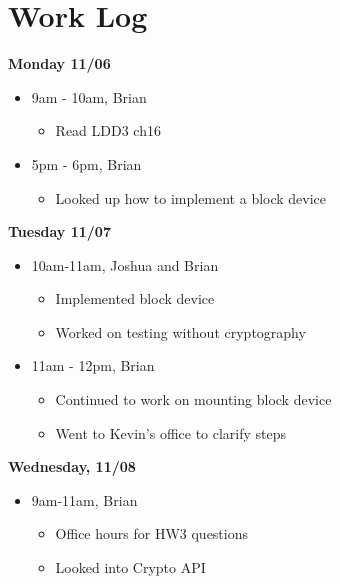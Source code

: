 \documentclass[letterpaper, onecolumn, draftclsnofoot, 10pt, compsoc]{IEEEtran}
\begin{document}
\section{Work Log}
    \begin{singlespace}
        \textbf{Monday 11/06}
            \begin{itemize}
                \item 9am - 10am, Brian 
                \begin{itemize}
                    \item Read LDD3 ch16
                \end{itemize}
                \item 5pm - 6pm, Brian 
                    \begin{itemize}
                        \item Looked up how to implement a block device 
                    \end{itemize}
            \end{itemize}
        \textbf{Tuesday 11/07}
            \begin{itemize}
                \item 10am-11am, Joshua and Brian 
                \begin{itemize}
                    \item Implemented block device 
                    \item Worked on testing without cryptography
                \end{itemize}
                \item 11am - 12pm, Brian 
                    \begin{itemize}
                        \item Continued to work on mounting block device
                        \item Went to Kevin's office to clarify steps
                    \end{itemize}
            \end{itemize}
        \textbf{Wednesday, 11/08}
            \begin{itemize}
                \item 9am-11am, Brian
                \begin{itemize}
                    \item Office hours for HW3 questions 
                    \item Looked into Crypto API 
                \end{itemize}

\end{itemize}
\end{singlespace}
\end{document}
